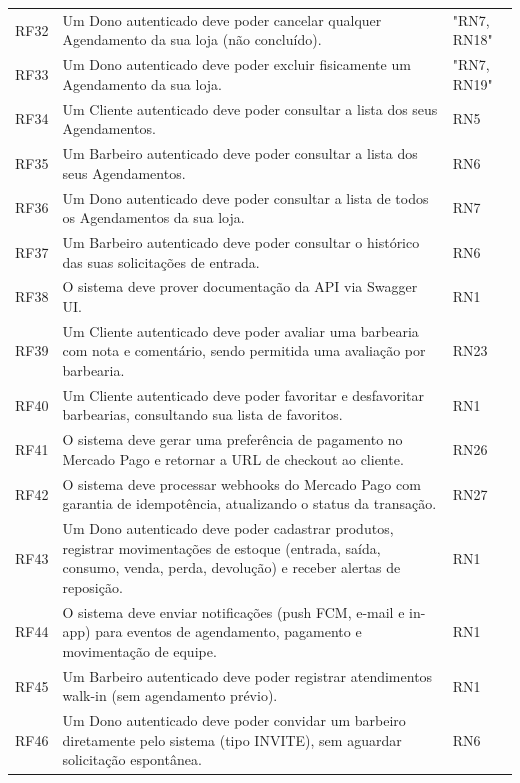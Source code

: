\documentclass[
    12pt, 
    a4paper, 
    oneside, 
    chapter=TITLE, 
    section=TITLE
]{abntex2}
\begin{document}
\begin{longtable}{p{1.5cm} p{10.5cm} p{2cm}}
    RF32 & Um Dono autenticado deve poder cancelar qualquer Agendamento da sua loja (não concluído). & "RN7, RN18" \\
    RF33 & Um Dono autenticado deve poder excluir fisicamente um Agendamento da sua loja. & "RN7, RN19" \\
    RF34 & Um Cliente autenticado deve poder consultar a lista dos seus Agendamentos. & RN5 \\
    RF35 & Um Barbeiro autenticado deve poder consultar a lista dos seus Agendamentos. & RN6 \\
    RF36 & Um Dono autenticado deve poder consultar a lista de todos os Agendamentos da sua loja. & RN7 \\
    RF37 & Um Barbeiro autenticado deve poder consultar o histórico das suas solicitações de entrada. & RN6 \\
    RF38 & O sistema deve prover documentação da API via Swagger UI. & RN1 \\
    RF39 & Um Cliente autenticado deve poder avaliar uma barbearia com nota e comentário, sendo permitida uma avaliação por barbearia. & RN23 \\
    RF40 & Um Cliente autenticado deve poder favoritar e desfavoritar barbearias, consultando sua lista de favoritos. & RN1 \\
    RF41 & O sistema deve gerar uma preferência de pagamento no Mercado Pago e retornar a URL de checkout ao cliente. & RN26 \\
    RF42 & O sistema deve processar webhooks do Mercado Pago com garantia de idempotência, atualizando o status da transação. & RN27 \\
    RF43 & Um Dono autenticado deve poder cadastrar produtos, registrar movimentações de estoque (entrada, saída, consumo, venda, perda, devolução) e receber alertas de reposição. & RN1 \\
    RF44 & O sistema deve enviar notificações (push FCM, e-mail e in-app) para eventos de agendamento, pagamento e movimentação de equipe. & RN1 \\
    RF45 & Um Barbeiro autenticado deve poder registrar atendimentos walk-in (sem agendamento prévio). & RN1 \\
    RF46 & Um Dono autenticado deve poder convidar um barbeiro diretamente pelo sistema (tipo INVITE), sem aguardar solicitação espontânea. & RN6 \\
\end{longtable}
\end{document}
